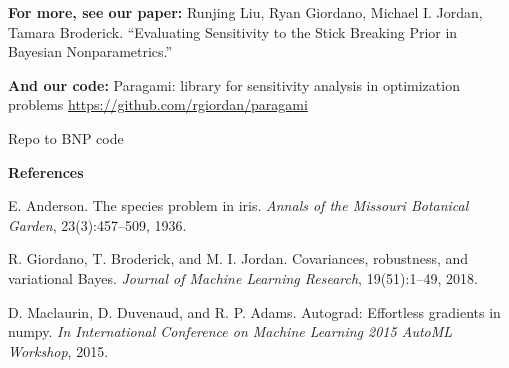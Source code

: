 \documentclass[10pt]{beamer}\usepackage[]{graphicx}\usepackage[]{color}
\begin{document}
\begin{frame}

{\bf For more, see our paper: }\newline
Runjing Liu, Ryan Giordano, Michael I. Jordan, Tamara Broderick. \newline
“Evaluating Sensitivity to the Stick Breaking Prior in Bayesian Nonparametrics.” 

{\bf And our code: }\newline
Paragami: library for sensitivity analysis in optimization problems \newline
{\color{blue}\url{https://github.com/rgiordan/paragami}}

Repo to BNP code

\vspace{0.2in}

\begin{scriptsize}

{\bf References}

E. Anderson. The species problem in iris. {\itshape Annals of the Missouri Botanical Garden}, 23(3):457–509, 1936.

R. Giordano, T. Broderick, and M. I. Jordan. Covariances, robustness, and variational Bayes. {\itshape Journal of Machine Learning Research}, 19(51):1–49, 2018.

D. Maclaurin, D. Duvenaud, and R. P. Adams. Autograd: Effortless gradients in numpy. {\itshape In International Conference on Machine Learning 2015 AutoML Workshop}, 2015.

\end{scriptsize}

\end{frame}
\end{document}

